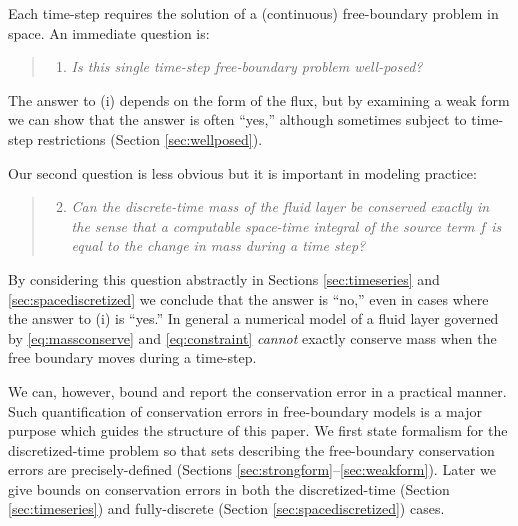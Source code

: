 \documentclass[final,leqno,onefignum,onetabnum]{siamltex1213bueler}
\begin{document}
Each time-step requires the solution of a (continuous) free-boundary problem in space.  An immediate question is:
  \begin{quote}
  \renewcommand{\labelenumi}{(\roman{enumi})}
  \begin{enumerate}
  \item \emph{Is this single time-step free-boundary problem well-posed?}
  \end{enumerate}
  \end{quote}
The answer to (i) depends on the form of the flux, but by examining a weak form we can show that the answer is often ``yes,'' although sometimes subject to time-step restrictions (Section \ref{sec:wellposed}).

Our second question is less obvious but it is important in modeling practice:
  \begin{quote}
  \renewcommand{\labelenumi}{(\roman{enumi})}
  \begin{enumerate}
  \setcounter{enumi}{1}
  \item \emph{Can the discrete-time mass of the fluid layer be conserved exactly in the sense that a computable space-time integral of the source term $f$ is equal to the change in mass during a time step?}
  \end{enumerate}
  \end{quote}
By considering this question abstractly in Sections \ref{sec:timeseries} and \ref{sec:spacediscretized} we conclude that the answer is ``no,'' even in cases where the answer to (i) is ``yes.''  In general a numerical model of a fluid layer governed by \eqref{eq:massconserve} and \eqref{eq:constraint} \emph{cannot} exactly conserve mass when the free boundary moves during a time-step.

We can, however, bound and report the conservation error in a practical manner.  Such quantification of conservation errors in free-boundary models is a major purpose which guides the structure of this paper.  We first state formalism for the discretized-time problem so that sets describing the free-boundary conservation errors are precisely-defined (Sections \ref{sec:strongform}--\ref{sec:weakform}).  Later we give bounds on conservation errors in both the discretized-time (Section \ref{sec:timeseries}) and fully-discrete (Section \ref{sec:spacediscretized}) cases.
\end{document}
